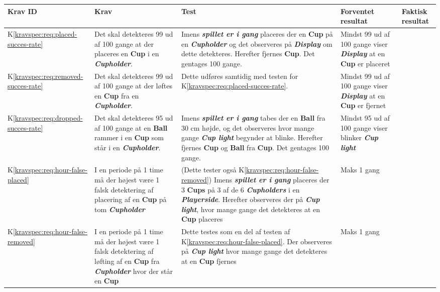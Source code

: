 \documentclass[Accepttestspecifikation/Accepttest_Main.tex]{subfiles}
\begin{document}
\begin{longtable}{|L{0.08\textwidth}|L{0.3\textwidth}|L{0.3\textwidth}|L{0.2\textwidth}|L{0.2\textwidth}|}
\hline
\textbf{Krav ID} & \textbf{Krav} & \textbf{Test} & \textbf{Forventet resultat} & \textbf{Faktisk resultat} \\ \hline

K\ref{kravspec:req:placed-succes-rate} & Det skal detekteres 99 ud af 100 gange at der placeres en \textbf{Cup} i en \textit{\textbf{Cupholder}}. & Imens \textbf{\textit{spillet er i gang}} placeres der en \textbf{Cup} på en \textbf{\textit{Cupholder}} og det observeres på \textbf{\textit{Display}} om dette detekteres. Herefter fjernes \textbf{Cup}. Det gentages 100 gange. & Mindst 99 ud af 100 gange viser \textbf{\textit{Display}} at en \textbf{Cup} er placeret & \\ \hline
K\ref{kravspec:req:removed-succes-rate} & Det skal detekteres 99 ud af 100 gange at der løftes en \textbf{Cup} fra en \textit{\textbf{Cupholder}}. & Dette udføres samtidig med testen for K\ref{kravspec:req:placed-succes-rate}. & Mindst 99 ud af 100 gange viser \textbf{\textit{Display}} at en \textbf{Cup} er fjernet & \\ \hline
K\ref{kravspec:req:dropped-succes-rate} & Det skal detekteres 95 ud af 100 gange at en \textbf{Ball} rammer i  en \textbf{Cup} som står i en \textit{\textbf{Cupholder}}. & Imens \textbf{\textit{spillet er i gang}} tabes der en \textbf{Ball} fra 30 cm højde, og det observeres hvor mange gange \textbf{\textit{Cup light}} begynder at blinke. Herefter fjernes \textbf{Cup} og \textbf{Ball} fra \textbf{Cup}. Det gentages 100 gange. & Mindst 95 ud af 100 gange viser blinker \textbf{\textit{Cup light}} & \\ \hline
K\ref{kravspec:req:hour-false-placed} & I en periode på 1 time må der højest være 1 falsk detektering af placering af en \textbf{Cup} på tom \textit{\textbf{Cupholder}} & (Dette tester også K\ref{kravspec:req:hour-false-removed}) Imens \textbf{\textit{spillet er i gang}} placeres der 3 \textbf{Cups} på 3 af de 6 \textbf{\textit{Cupholders}} i en \textbf{\textit{Playerside}}. Herefter observeres der på \textbf{\textit{Cup light}}, hvor mange gange det detekteres at en \textbf{Cup} placeres & Maks 1 gang & \\ \hline

K\ref{kravspec:req:hour-false-removed}& I en periode på 1 time må der højest være 1 falsk detektering af løfting af en \textbf{Cup} fra \textit{\textbf{Cupholder}} hvor der står en \textbf{Cup}& Dette testes som en del af testen af K\ref{kravspec:req:hour-false-placed}. Der observeres på \textbf{\textit{Cup light}} hvor mange gange det detekteres at en \textbf{Cup} fjernes & Maks 1 gang & \\ \hline


\end{longtable}
\end{document}
